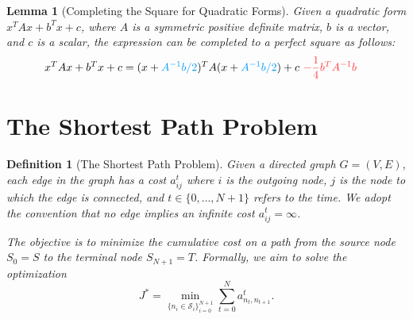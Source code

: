 \documentclass[a4 paper]{article}
\numberwithin{equation}{section}
\theoremstyle{boldStyle}
\theoremstyle{boldBlueStyle}
\newtheorem{lemma}{Lemma}[section]
\theoremstyle{boldPurpleStyle}
\theoremstyle{boldRedStyle}
\newtheorem{definition}{Definition}[section]
\begin{document}
\begin{lemma}[Completing the Square for Quadratic Forms]
  Given a quadratic form \( x^T A x + b^T x + c \), where \( A \) is a symmetric positive definite matrix, \( b \) is a vector, and \( c \) is a scalar, the expression can be completed to a perfect square as follows:
  \begin{align*}
    x^T A x + b^T x + c &= (x + \tblu{A^{-1} b/2})^T A (x + \tblu{A^{-1} b/2}) + c \text{ } \tred{ - \frac{1}{4} b^T A^{-1} b}
  \end{align*}
  \end{lemma}







\newpage
\section{The Shortest Path Problem}

\begin{definition}[The Shortest Path Problem]
  Given a directed graph \( G = (V, E) \), each edge in the graph has a cost \( a^t_{ij} \) where 
  \( i \) is the outgoing node, \( j \) is the node to which the edge is connected, 
  and \( t \in \{0, \ldots, N+1\} \) refers to the time. We adopt the convention that no edge implies 
  an infinite cost \( a^t_{ij} = \infty \).

  The objective is to minimize the cumulative cost on a path from the source node \( S_0 = S \) to the 
  terminal node \( S_{N+1} = T \). Formally, we aim to solve the optimization
  \begin{equation}
      J^* = \min_{\{n_i \in \mathcal{S}_i\}_{i=0}^{N+1}} \sum_{t=0}^{N} a^t_{n_t, n_{t+1}}.
  \end{equation}
\end{definition}
\end{document}

